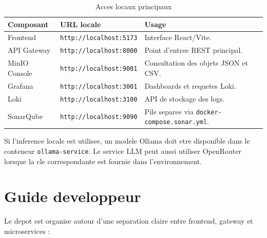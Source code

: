 \begin{table}[H]
\centering
\small
\caption{Acces locaux principaux}
\label{tab:annexe-acces-locaux}
\begin{tabular}{|>{\raggedright\arraybackslash}p{4cm}
                |>{\raggedright\arraybackslash}p{5cm}
                |>{\raggedright\arraybackslash}p{5cm}|}
\hline
\textbf{Composant} & \textbf{URL locale} & \textbf{Usage} \\
\hline
Frontend & \texttt{http://localhost:5173} & Interface React/Vite. \\
\hline
API Gateway & \texttt{http://localhost:8000} & Point d'entree REST principal. \\
\hline
MinIO Console & \texttt{http://localhost:9001} & Consultation des objets JSON et CSV. \\
\hline
Grafana & \texttt{http://localhost:3001} & Dashboards et requetes Loki. \\
\hline
Loki & \texttt{http://localhost:3100} & API de stockage des logs. \\
\hline
SonarQube & \texttt{http://localhost:9090} & Pile separee via \texttt{docker-compose.sonar.yml}. \\
\hline
\end{tabular}
\end{table}

Si l'inference locale est utilisee, un modele Ollama doit etre disponible dans le conteneur
\texttt{ollama-service}. Le service LLM peut aussi utiliser OpenRouter lorsque la cle
correspondante est fournie dans l'environnement.

\section{Guide developpeur}

Le depot est organise autour d'une separation claire entre frontend, gateway et microservices :

